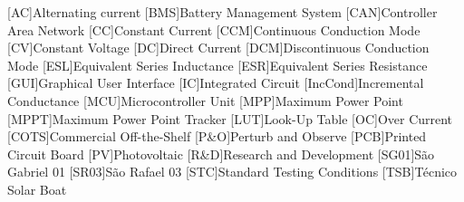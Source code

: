 



\begin{acronym}[H.264/mppt]
    \setlength{\itemsep}{-3pt}
    \setlength{\parsep}{-3pt}

    [AC]{Alternating current}
    [BMS]{Battery Management System}
    [CAN]{Controller Area Network}
    [CC]{Constant Current}
    [CCM]{Continuous Conduction Mode}
    [CV]{Constant Voltage}
    [DC]{Direct Current}
    [DCM]{Discontinuous Conduction Mode}
    [ESL]{Equivalent Series Inductance}
    [ESR]{Equivalent Series Resistance}
    [GUI]{Graphical User Interface}
    [IC]{Integrated Circuit}
    [IncCond]{Incremental Conductance}
    [MCU]{Microcontroller Unit}
    [MPP]{Maximum Power Point}
    [MPPT]{Maximum Power Point Tracker}
    [LUT]{Look-Up Table}
    [OC]{Over Current}
    [COTS]{Commercial Off-the-Shelf}
    [P\&O]{Perturb and Observe}
    [PCB]{Printed Circuit Board}
    [PV]{Photovoltaic}
    [R\&D]{Research and Development}
    [SG01]{São Gabriel 01}
    [SR03]{São Rafael 03}
    [STC]{Standard Testing Conditions}
    [TSB]{Técnico Solar Boat}


    

    

\end{acronym}






